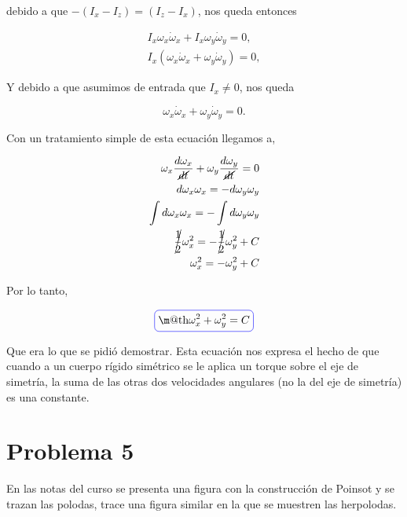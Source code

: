 \documentclass[a4paper,10pt]{article}
\makeatletter
\numberwithin{equation}{section}
\newcommand*{\boxcolor}{blue}
\renewcommand{\boxed}[1]{\textcolor{\boxcolor}{%
\tikz[baseline={([yshift=-1ex]current bounding box.center)}] \node [rectangle, minimum width=1ex,rounded corners,draw] {\normalcolor\m@th$\displaystyle#1$};}}
\makeatother
\begin{document}
debido a que $-(I_x - I_z) = (I_z - I_x)$, nos queda entonces 

\begin{align*}
 I_x \omega_x \dot{\omega}_x + I_x \omega_y \dot{\omega}_y = 0, \\
 I_x (\omega_x \dot{\omega}_x + \omega_y \dot{\omega}_y) = 0,
\end{align*}

Y debido a que asumimos de entrada que $I_x \ne 0$, nos queda 

\begin{equation}
 \omega_x \dot{\omega}_x + \omega_y \dot{\omega}_y = 0.
\end{equation}

Con un tratamiento simple de esta ecuación llegamos a,

\begin{align}
\begin{split}
\omega_x \frac{d\omega_x}{\cancel{dt}} + \omega_y \frac{d\omega_y}{\cancel{dt}} = 0 \\
%
d\omega_x \omega_x = - d\omega_y \omega_y \\
%
\int d\omega_x \omega_x = - \int d\omega_y \omega_y \\
%
\cancel{\frac{1}{2}} \omega_x^2 = - \cancel{\frac{1}{2}} \omega_y^2 + C \\
%
 \omega_x^2 = - \omega_y^2 + C
%
\end{split}
\end{align}

Por lo tanto,

\begin{equation}
 \boxed{\omega_x^2 + \omega_y^2 = C}
\end{equation}

Que era lo que se pidió demostrar. Esta ecuación nos expresa el hecho de que cuando 
a un cuerpo rígido simétrico se le aplica un torque sobre el eje de simetría, la suma de las
otras dos velocidades angulares (no la del eje de simetría) es una constante.


\section{Problema 5}

En las notas del curso se presenta una figura con la construcción de Poinsot y se 
trazan las polodas, trace una figura similar en la que se muestren las herpolodas.

\vspace{.3cm}
\end{document}
